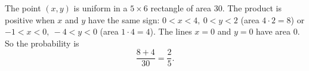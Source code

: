 The point $(x,y)$ is uniform in a $5\times6$ rectangle of area $30$. The product is positive when $x$ and $y$ have the same sign: $0<x<4,\ 0<y<2$ (area $4\cdot2=8$) or $-1<x<0,\ -4<y<0$ (area $1\cdot4=4$). The lines $x=0$ and $y=0$ have area $0$. So the probability is
\[\dfrac{8+4}{30}=\boxed{\dfrac{2}{5}}.\]
